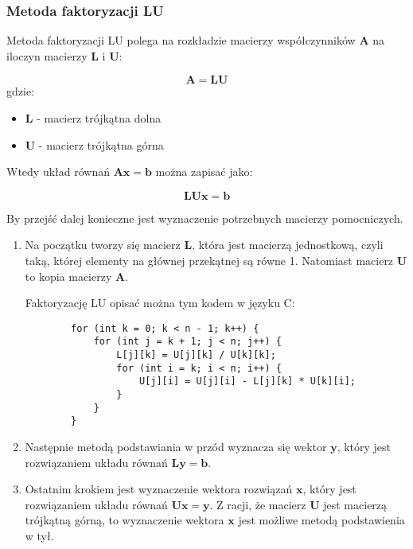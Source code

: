 \documentclass{article}
\begin{document}
\subsubsection{Metoda faktoryzacji LU}

Metoda faktoryzacji LU polega na rozkładzie macierzy 
współczynników $\boldsymbol{A}$
na iloczyn macierzy $\boldsymbol{L}$ i $\boldsymbol{U}$:

\begin{equation}
    \boldsymbol{A = LU}
\end{equation}
gdzie:
\begin{itemize}
    \item $\boldsymbol{L}$ - macierz trójkątna dolna
    \item $\boldsymbol{U}$ - macierz trójkątna górna
\end{itemize}

Wtedy układ równań $\boldsymbol{Ax = b}$ można zapisać jako:

\begin{equation*}
    \boldsymbol{LUx = b}
\end{equation*}

By przejść dalej konieczne jest wyznaczenie potrzebnych macierzy pomocniczych.
\begin{enumerate}
    \item Na początku tworzy się macierz $\boldsymbol{L}$, która jest macierzą 
    jednostkową, czyli taką, której elementy na głównej przekątnej są równe 1.
    Natomiast macierz $\boldsymbol{U}$ to kopia macierzy $\boldsymbol{A}$.
    
    Faktoryzację LU opisać można tym kodem w języku C:
    
    \begin{lstlisting}
        for (int k = 0; k < n - 1; k++) {
            for (int j = k + 1; j < n; j++) {
                L[j][k] = U[j][k] / U[k][k];
                for (int i = k; i < n; i++) {
                    U[j][i] = U[j][i] - L[j][k] * U[k][i];
                }
            }
        }
    \end{lstlisting}

    \item Następnie metodą podstawiania w przód wyznacza 
    się wektor $\boldsymbol{y}$,
    który jest rozwiązaniem układu równań $\boldsymbol{Ly = b}$.

    \item Ostatnim krokiem jest wyznaczenie wektora rozwiązań $\boldsymbol{x}$,
    który jest rozwiązaniem układu równań $\boldsymbol{Ux = y}$.
    Z racji, że macierz $\boldsymbol{U}$ jest macierzą trójkątną górną,
    to wyznaczenie wektora $\boldsymbol{x}$ jest możliwe metodą 
    podstawienia w tył.
\end{enumerate}
\end{document}
